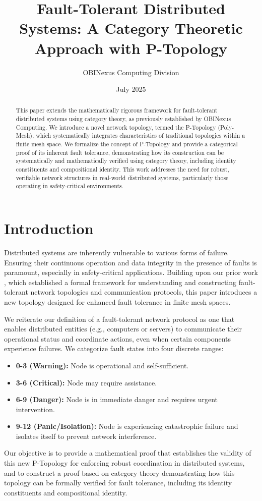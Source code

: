 \documentclass[10pt]{article}
\title{Fault-Tolerant Distributed Systems: A Category Theoretic Approach with P-Topology}
\author{OBINexus Computing Division}
\date{July 2025}
\begin{document}
\maketitle

\begin{abstract}
This paper extends the mathematically rigorous framework for fault-tolerant distributed systems using category theory, as previously established by OBINexus Computing. We introduce a novel network topology, termed the P-Topology (Poly-Mesh), which systematically integrates characteristics of traditional topologies within a finite mesh space. We formalize the concept of P-Topology and provide a categorical proof of its inherent fault tolerance, demonstrating how its construction can be systematically and mathematically verified using category theory, including identity constituents and compositional identity. This work addresses the need for robust, verifiable network structures in real-world distributed systems, particularly those operating in safety-critical environments.
\end{abstract}

\section{Introduction}
Distributed systems are inherently vulnerable to various forms of failure. Ensuring their continuous operation and data integrity in the presence of faults is paramount, especially in safety-critical applications. Building upon our prior work \cite{OBINexusFaultTolerance}, which established a formal framework for understanding and constructing fault-tolerant network topologies and communication protocols, this paper introduces a new topology designed for enhanced fault tolerance in finite mesh spaces.

We reiterate our definition of a fault-tolerant network protocol as one that enables distributed entities (e.g., computers or servers) to communicate their operational status and coordinate actions, even when certain components experience failures. We categorize fault states into four discrete ranges:
\begin{itemize}
    \item \textbf{0-3 (Warning):} Node is operational and self-sufficient.
    \item \textbf{3-6 (Critical):} Node may require assistance.
    \item \textbf{6-9 (Danger):} Node is in immediate danger and requires urgent intervention.
    \item \textbf{9-12 (Panic/Isolation):} Node is experiencing catastrophic failure and isolates itself to prevent network interference.
\end{itemize}
Our objective is to provide a mathematical proof that establishes the validity of this new P-Topology for enforcing robust coordination in distributed systems, and to construct a proof based on category theory demonstrating how this topology can be formally verified for fault tolerance, including its identity constituents and compositional identity.
\end{document}
